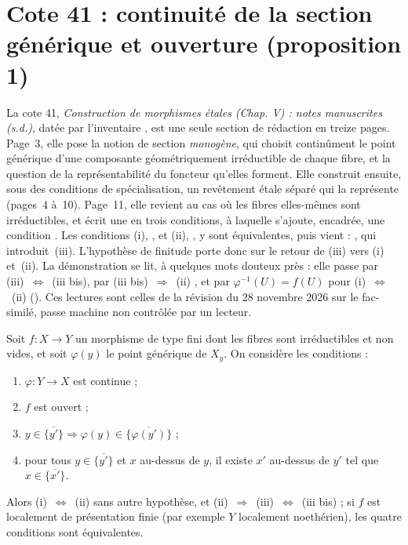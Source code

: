 \section[Cote 41 : continuité de la section générique et ouverture (proposition 1)]{Cote 41 : continuité de la section générique et ouverture (proposition 1)\protect{}}\label{sec:41}

La cote 41, \emph{Construction de morphismes étales (Chap. V) : notes manuscrites (s.d.)}, datée par l'inventaire \q{[années 1960-1970]}, est une seule section de rédaction en treize pages. Page~3, elle pose la notion de section \emph{monogène}, qui choisit continûment le point générique d'une composante géométriquement irréductible de chaque fibre, et la question de la représentabilité du foncteur qu'elles forment. Elle construit ensuite, sous des conditions de spécialisation, un revêtement étale séparé qui la représente (pages~4 à~10). Page~11, elle revient au cas où les fibres elles-mêmes sont irréductibles, et écrit une  en trois conditions, à laquelle s'ajoute, encadrée, une condition . Les conditions (i), , et (ii), , y sont équivalentes, puis vient : , qui introduit~(iii). L'hypothèse de finitude porte donc sur le retour de (iii) vers (i) et~(ii). La démonstration se lit, à quelques mots douteux près : elle passe par (iii)~$\Leftrightarrow$~(iii bis), par (iii bis)~$\Rightarrow$~(ii) , et par $\varphi^{-1}(U) = f(U)$ pour (i)~$\Leftrightarrow$~(ii) (). Ces lectures sont celles de la révision du 28 novembre 2026 sur le fac-similé, passe machine non contrôlée par un lecteur.

\begin{enonce}[Proposition 1]
Soit $f : X \to Y$ un morphisme de type fini dont les fibres sont irréductibles et non vides, et soit $\varphi(y)$ le point générique de $X_y$. On considère les conditions :
\begin{enumerate}
\item[(i)] $\varphi : Y \to X$ est continue ;
\item[(ii)] $f$ est ouvert ;
\item[(iii)] $y \in \overline{\{y'\}} \Rightarrow \varphi(y) \in \overline{\{\varphi(y')\}}$ ;
\item[(iii bis)] pour tous $y \in \overline{\{y'\}}$ et $x$ au-dessus de $y$, il existe $x'$ au-dessus de $y'$ tel que $x \in \overline{\{x'\}}$.
\end{enumerate}
Alors (i)~$\Leftrightarrow$~(ii) sans autre hypothèse, et (ii)~$\Rightarrow$~(iii)~$\Leftrightarrow$~(iii bis) ; si $f$ est localement de présentation finie (par exemple $Y$ localement noethérien), les quatre conditions sont équivalentes.
\end{enonce}

